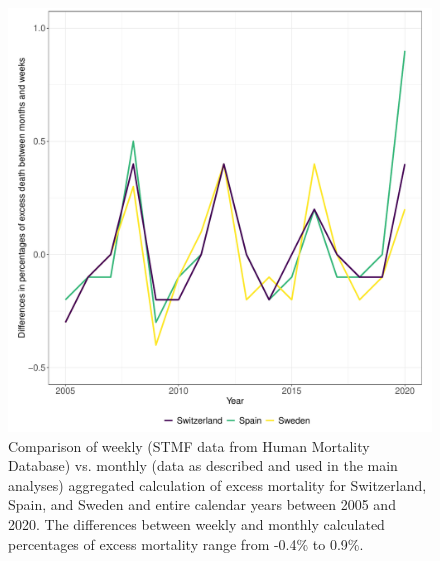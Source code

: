 \documentclass{article}
\begin{document}
	\begin{figure}[H]
	\centering	
	\includegraphics[width=.7\linewidth]{../plot_appendix_week_month}
	\caption{Comparison of weekly (STMF data from Human Mortality Database) vs. monthly (data as described and used in the main analyses) aggregated calculation of excess mortality for Switzerland, Spain, and Sweden and entire calendar years between 2005 and 2020. The differences between weekly and monthly calculated percentages of excess mortality range from -0.4\% to 0.9\%. }
\end{figure}


	
	\clearpage


	
	
		
	
\end{document}
